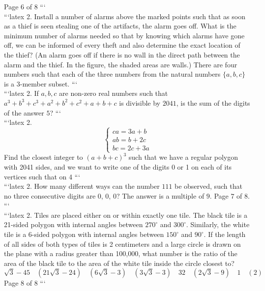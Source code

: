 Page 6 of 8
```
\\
```latex
2. Install a number of alarms above the marked points such that as soon as a thief is seen stealing one of the artifacts, the alarm goes off. What is the minimum number of alarms needed so that by knowing which alarms have gone off, we can be informed of every theft and also determine the exact location of the thief? (An alarm goes off if there is no wall in the direct path between the alarm and the thief. In the figure, the shaded areas are walls.) There are four numbers such that each of the three numbers from the natural numbers $\{a, b, c\}$ is a 3-member subset.
```
\\
```latex
2. If $a, b, c$ are non-zero real numbers such that $a^3 + b^3 + c^3 + a^2 + b^2 + c^2 + a + b + c$ is divisible by $2041$, is the sum of the digits of the answer $5$?
```
\\
```latex
2. 
\[
\begin{cases} 
ca = 3a + b \\
ab = b + 2c \\
bc = 2c + 3a 
\end{cases}
\]
Find the closest integer to \( (a+b+c)^3 \) such that we have a regular polygon with 2041 sides, and we want to write one of the digits 0 or 1 on each of its vertices such that on 4
```
\\
```latex
2. How many different ways can the number $111$ be observed, such that no three consecutive digits are $0$, $0$, $0$? The answer is a multiple of $9$. Page $7$ of $8$.
```
\\
```latex
2. Tiles are placed either on or within exactly one tile. The black tile is a 21-sided polygon with internal angles between $270^\circ$ and $300^\circ$. Similarly, the white tile is a 6-sided polygon with internal angles between $150^\circ$ and $90^\circ$. If the length of all sides of both types of tiles is 2 centimeters and a large circle is drawn on the plane with a radius greater than 100,000, what number is the ratio of the area of the black tile to the area of the white tile inside the circle closest to? 
\[
\sqrt{3} - 45 \quad (21 \sqrt{3} - 24) \quad (6 \sqrt{3} - 3) \quad (3 \sqrt{3} - 3) \quad 32 \quad (2 \sqrt{3} - 9) \quad 1 \quad (2)
\]
Page 8 of 8
```
\\
